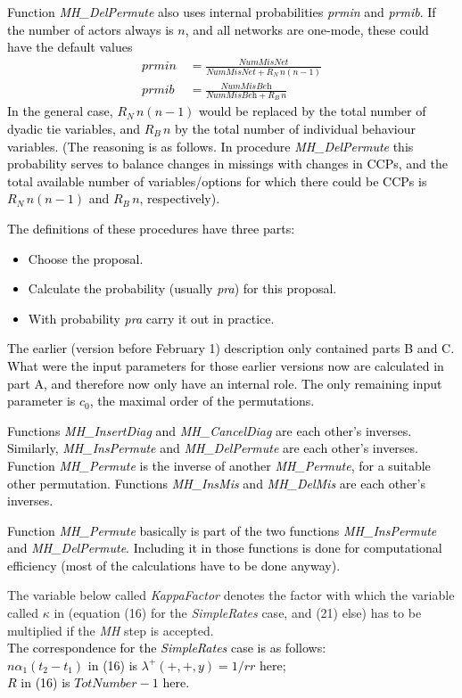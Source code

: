 \documentclass[a4paper,12pt,fleqn]{article}
\newcommand{\addaa}[1]{{\textcolor[named]{Black}{#1}}}  %
\newcommand{\addcf}[1]{{\textcolor[named]{Black}{#1}}}
\begin{document}
\addaa{
Function \textit{MH\_DelPermute} also uses internal probabilities \textit{prmin}
and \textit{prmib}.
If the number of actors always is $n$, and all networks are one-mode,
these could have the default values
\begin{align}
  \textit{prmin} & \, = \frac{\textit{NumMisNet}}{\textit{NumMisNet} + R_N\, n(n-1)} \\[0.5em]
  \textit{prmib} & \, = \frac{\textit{NumMisBeh}}{\textit{NumMisBeh} + R_B\, n}\
\end{align}
In the general case, $R_N\, n(n-1)$ would be replaced by the total number of
dyadic tie variables, and $R_B\, n$ by the total number of individual
behaviour variables.
(The reasoning is as follows.
In procedure \textit{MH\_DelPermute} this probability serves to balance
changes in missings with changes in CCPs, and the
total available number of variables/options
for which there could be CCPs is $R_N\, n(n-1)$ and $R_B \,n$, respectively).}

\newpage
\addaa{The definitions of these procedures have three parts:
\begin{itemize}
\item[A.] Choose the proposal.
\item[B.] Calculate the probability (usually \textit{pra}) for this proposal.
\item[C.] With probability \textit{pra} carry it out in practice.
\end{itemize}
The earlier (version before February 1) description only contained parts B and C.
What were the input parameters for those earlier versions now are calculated in part A,
and therefore now only have an internal role.
The only remaining input parameter is $c_0$, the maximal order of the permutations.
}

\addaa{
Functions \textit{MH\_InsertDiag} and \textit{MH\_CancelDiag} are each other's inverses.
Similarly, \textit{MH\_InsPermute} and \textit{MH\_DelPermute} are each other's inverses.
Function \textit{MH\_Permute} is the inverse of another \textit{MH\_Permute},
for a suitable other permutation.
}
\addcf{Functions \textit{MH\_InsMis} and \textit{MH\_DelMis}
are each other's inverses.
}


\addaa{
Function \textit{MH\_Permute} basically is part of the two functions
\textit{MH\_InsPermute} and \textit{MH\_DelPermute}. Including it in those functions
is done for computational efficiency (most of the calculations have to be done anyway).
}

The variable below called \textit{KappaFactor} denotes the factor with which the
variable called $\kappa$ in
\citet{SnijdersEA10a}
(equation (16) for the  \textit{SimpleRates} case, and (21) else)
has to be multiplied if the \textit{MH} step is accepted.\\
\addcf{The correspondence for the   \textit{SimpleRates} case is as follows:\\
$n\alpha_1(t_2-t_1)$ in (16) is $\lambda^+(+,+,y) = 1/rr$ here;\\
$R$ in (16) is $\textit{TotNumber} -1$ here.}
\end{document}
